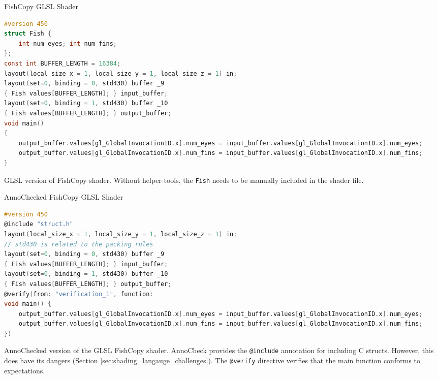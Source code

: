 \documentclass[a4paper,12pt,twoside,openright]{report}
\begin{document}
\begin{lstfloat}
\begin{center}
FishCopy GLSL Shader
\end{center}
\begin{lstlisting}[language=C]
#version 450
struct Fish {
    int num_eyes; int num_fins;
};
const int BUFFER_LENGTH = 16384;
layout(local_size_x = 1, local_size_y = 1, local_size_z = 1) in;
layout(set=0, binding = 0, std430) buffer _9
{ Fish values[BUFFER_LENGTH]; } input_buffer;
layout(set=0, binding = 1, std430) buffer _10
{ Fish values[BUFFER_LENGTH]; } output_buffer;
void main()
{
    output_buffer.values[gl_GlobalInvocationID.x].num_eyes = input_buffer.values[gl_GlobalInvocationID.x].num_eyes;
    output_buffer.values[gl_GlobalInvocationID.x].num_fins = input_buffer.values[gl_GlobalInvocationID.x].num_fins;
}
\end{lstlisting}
\caption{GLSL version of FishCopy shader. Without helper-tools, the
\texttt{Fish} needs to be manually included in the shader file.}
\label{lst:glsl_shader}
\end{lstfloat}

\begin{lstfloat}
\begin{center}
AnnoChecked FishCopy GLSL Shader
\end{center}
\begin{lstlisting}[language=C]
#version 450
@include "struct.h"
layout(local_size_x = 1, local_size_y = 1, local_size_z = 1) in;
// std430 is related to the packing rules
layout(set=0, binding = 0, std430) buffer _9
{ Fish values[BUFFER_LENGTH]; } input_buffer;
layout(set=0, binding = 1, std430) buffer _10
{ Fish values[BUFFER_LENGTH]; } output_buffer;
@verify(from: "verification_1", function:
void main() {
    output_buffer.values[gl_GlobalInvocationID.x].num_eyes = input_buffer.values[gl_GlobalInvocationID.x].num_eyes;
    output_buffer.values[gl_GlobalInvocationID.x].num_fins = input_buffer.values[gl_GlobalInvocationID.x].num_fins;
})
\end{lstlisting}
\caption{AnnoChecked version of the GLSL FishCopy shader. AnnoCheck provides
the \texttt{@include} annotation for including C structs. However, this does
have its dangers (Section \ref{sec:shading_langauge_challenges}). The \texttt{@verify} directive
verifies that the main function conforms to expectations.}
\label{lst:anno_check_shader}
\end{lstfloat}
\end{document}

